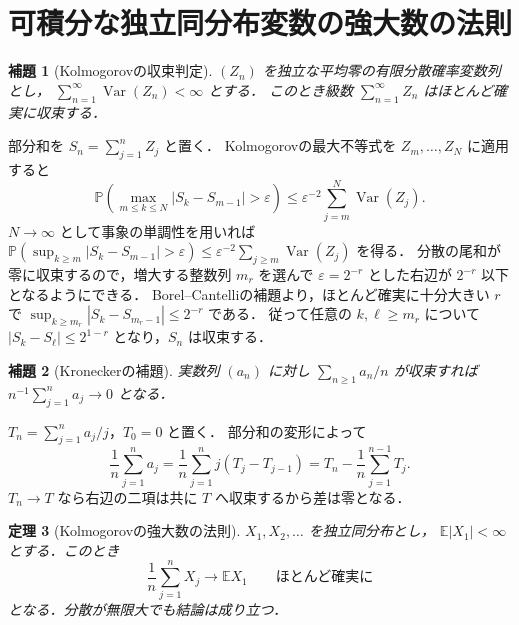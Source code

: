 \documentclass[a5paper,10pt,onecolumn]{jsarticle}
\makeatletter
\theoremstyle{mathnotetheorem}
\newtheorem{theorem}{定理}[section]
\newtheorem{lemma}[theorem]{補題}
\renewcommand{\proofname}{証明}
\renewenvironment{proof}[1][\proofname]{%
  \par\pushQED{\qed}\normalfont\topsep4\p@\@plus2\p@\relax
  \trivlist\item[\hskip\labelsep\bfseries #1]\ignorespaces
}{\popQED\endtrivlist\@endpefalse}
\makeatother
\begin{document}
\section{可積分な独立同分布変数の強大数の法則}
\begin{lemma}[Kolmogorovの収束判定]
$(Z_n)$ を独立な平均零の有限分散確率変数列とし，
$\sum_{n=1}^\infty\operatorname{Var}(Z_n)<\infty$ とする．
このとき級数 $\sum_{n=1}^\infty Z_n$ はほとんど確実に収束する．
\end{lemma}
\begin{proof}
部分和を $S_n=\sum_{j=1}^n Z_j$ と置く．
Kolmogorovの最大不等式を $Z_m,\ldots,Z_N$ に適用すると
\[
 \mathbb P\!\left(\max_{m\le k\le N}
 |S_k-S_{m-1}|>\varepsilon\right)
 \le\varepsilon^{-2}\sum_{j=m}^N\operatorname{Var}(Z_j).
\]
$N\to\infty$ として事象の単調性を用いれば
$\mathbb P(\sup_{k\ge m}|S_k-S_{m-1}|>\varepsilon)
\le\varepsilon^{-2}\sum_{j\ge m}\operatorname{Var}(Z_j)$ を得る．
分散の尾和が零に収束するので，増大する整数列 $m_r$ を選んで
$\varepsilon=2^{-r}$ とした右辺が $2^{-r}$ 以下となるようにできる．
Borel--Cantelliの補題より，ほとんど確実に十分大きい $r$ で
$\sup_{k\ge m_r}|S_k-S_{m_r-1}|\le2^{-r}$ である．
従って任意の $k,\ell\ge m_r$ について
$|S_k-S_\ell|\le2^{1-r}$ となり，$S_n$ は収束する．
\end{proof}
\begin{lemma}[Kroneckerの補題]
実数列 $(a_n)$ に対し $\sum_{n\ge1}a_n/n$ が収束すれば
$n^{-1}\sum_{j=1}^na_j\to0$ となる．
\end{lemma}
\begin{proof}
$T_n=\sum_{j=1}^na_j/j$，$T_0=0$ と置く．
部分和の変形によって
\[
 \frac1n\sum_{j=1}^na_j
 =\frac1n\sum_{j=1}^nj(T_j-T_{j-1})
 =T_n-\frac1n\sum_{j=1}^{n-1}T_j.
\]
$T_n\to T$ なら右辺の二項は共に $T$ へ収束するから差は零となる．
\end{proof}
\begin{theorem}[Kolmogorovの強大数の法則]
$X_1,X_2,\ldots$ を独立同分布とし，
$\mathbb E|X_1|<\infty$ とする．このとき
\[
 \frac1n\sum_{j=1}^nX_j\longrightarrow
 \mathbb E X_1\qquad\text{ほとんど確実に}
\]
となる．分散が無限大でも結論は成り立つ．
\end{theorem}
\end{document}
